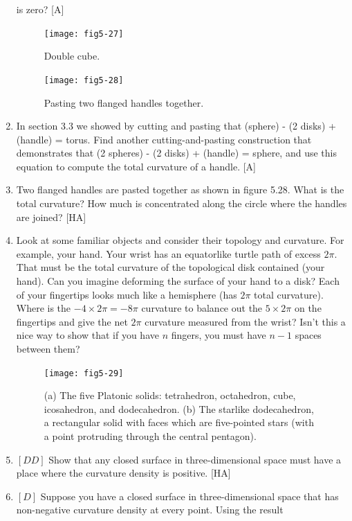 \documentclass{book}
\begin{document}
\begin{enumerate}
is zero? [A]
\begin{figure}
\begin{center}
\texttt{[image: fig5-27]}
\caption{Double cube.}
\end{center}
\end{figure}
\begin{figure}
\begin{center}
\texttt{[image: fig5-28]}
\caption{Pasting two flanged handles together.}
\end{center}
\end{figure}
\item In section 3.3 we showed by cutting and pasting that
(sphere) - (2 disks) + (handle) = torus. Find another cutting-and-pasting construction that demonstrates that
(2 spheres) - (2 disks) + (handle) = sphere,
and use this equation to compute the total curvature of a handle. [A]
\item Two flanged handles are pasted together as shown in figure 5.28.
What is the total curvature? How much is concentrated along the circle
where the handles are joined? [HA]
\item Look at some familiar objects and consider their topology and
curvature. For example, your hand. Your wrist has an equatorlike turtle
path of excess $2 \pi$. That must be the total curvature of the topological
disk contained (your hand). Can you imagine deforming the surface
of your hand to a disk? Each of your fingertips looks much like a
hemisphere (has $2 \pi$ total curvature). Where is the $-4 \times 2 \pi = -8 \pi$
curvature to balance out the $5 \times 2 \pi$ on the fingertips and give the net
$2 \pi $ curvature measured from the wrist? Isn't this a nice way to show
that if you have $n$ fingers, you must have $n - 1$ spaces between them?
\begin{figure}
\begin{center}
\texttt{[image: fig5-29]}
\caption{(a) The five Platonic solids: tetrahedron, octahedron, cube, icosahedron, and dodecahedron. (b) The starlike dodecahedron, a rectangular solid with faces which are five-pointed stars (with a point protruding through the central pentagon).}
\end{center}
\end{figure}
\item $[DD]$ Show that any closed surface in three-dimensional space must
have a place where the curvature density is positive. [HA]
\item $[D]$ Suppose you have a closed surface in three-dimensional space
that has non-negative curvature density at every point. Using the result

\end{enumerate}
\end{document}
